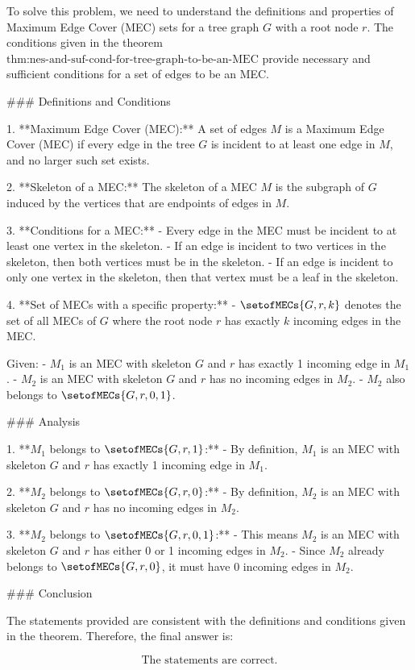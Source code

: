 To solve this problem, we need to understand the definitions and properties of Maximum Edge Cover (MEC) sets for a tree graph \( G \) with a root node \( r \). The conditions given in the theorem \(\text{thm:nes-and-suf-cond-for-tree-graph-to-be-an-MEC}\) provide necessary and sufficient conditions for a set of edges to be an MEC.

### Definitions and Conditions

1. **Maximum Edge Cover (MEC):** A set of edges \( M \) is a Maximum Edge Cover (MEC) if every edge in the tree \( G \) is incident to at least one edge in \( M \), and no larger such set exists.
   
2. **Skeleton of a MEC:** The skeleton of a MEC \( M \) is the subgraph of \( G \) induced by the vertices that are endpoints of edges in \( M \).

3. **Conditions for a MEC:**
   - Every edge in the MEC must be incident to at least one vertex in the skeleton.
   - If an edge is incident to two vertices in the skeleton, then both vertices must be in the skeleton.
   - If an edge is incident to only one vertex in the skeleton, then that vertex must be a leaf in the skeleton.

4. **Set of MECs with a specific property:**
   - \(\setofMECs{G, r, k}\) denotes the set of all MECs of \( G \) where the root node \( r \) has exactly \( k \) incoming edges in the MEC.

Given:
- \( M_1 \) is an MEC with skeleton \( G \) and \( r \) has exactly 1 incoming edge in \( M_1 \).
- \( M_2 \) is an MEC with skeleton \( G \) and \( r \) has no incoming edges in \( M_2 \).
- \( M_2 \) also belongs to \(\setofMECs{G, r, 0, 1}\).

### Analysis

1. **\( M_1 \) belongs to \(\setofMECs{G, r, 1}\):**
   - By definition, \( M_1 \) is an MEC with skeleton \( G \) and \( r \) has exactly 1 incoming edge in \( M_1 \).

2. **\( M_2 \) belongs to \(\setofMECs{G, r, 0}\):**
   - By definition, \( M_2 \) is an MEC with skeleton \( G \) and \( r \) has no incoming edges in \( M_2 \).

3. **\( M_2 \) belongs to \(\setofMECs{G, r, 0, 1}\):**
   - This means \( M_2 \) is an MEC with skeleton \( G \) and \( r \) has either 0 or 1 incoming edges in \( M_2 \).
   - Since \( M_2 \) already belongs to \(\setofMECs{G, r, 0}\), it must have 0 incoming edges in \( M_2 \).

### Conclusion

The statements provided are consistent with the definitions and conditions given in the theorem. Therefore, the final answer is:

\[
\boxed{\text{The statements are correct.}}
\]